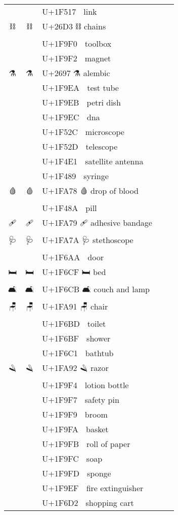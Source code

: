 \documentclass[a4paper,12pt]{ltjarticle}
\newcommand{\fontA}[1]{{\fontspec[RawFeature={mode=harf,+dist,+ccmp}]{Segoe UI Emoji} #1}}
\newcommand{\fontB}[1]{{\fontspec[RawFeature={mode=harf,+dist,+ccmp}]{Noto Color Emoji} #1}}
\begin{document}
\begin{longtable}[c]{ccp{0.8\linewidth}}
\fontA{🔗}&\fontB{🔗}&U+1F517 🔗 link\\
\fontA{⛓}&\fontB{⛓}&U+26D3 ⛓ chains\\
\fontA{🧰}&\fontB{🧰}&U+1F9F0 🧰 toolbox\\
\fontA{🧲}&\fontB{🧲}&U+1F9F2 🧲 magnet\\
\fontA{⚗}&\fontB{⚗}&U+2697 ⚗ alembic\\
\fontA{🧪}&\fontB{🧪}&U+1F9EA 🧪 test tube\\
\fontA{🧫}&\fontB{🧫}&U+1F9EB 🧫 petri dish\\
\fontA{🧬}&\fontB{🧬}&U+1F9EC 🧬 dna\\
\fontA{🔬}&\fontB{🔬}&U+1F52C 🔬 microscope\\
\fontA{🔭}&\fontB{🔭}&U+1F52D 🔭 telescope\\
\fontA{📡}&\fontB{📡}&U+1F4E1 📡 satellite antenna\\
\fontA{💉}&\fontB{💉}&U+1F489 💉 syringe\\
\fontA{🩸}&\fontB{🩸}&U+1FA78 🩸 drop of blood\\
\fontA{💊}&\fontB{💊}&U+1F48A 💊 pill\\
\fontA{🩹}&\fontB{🩹}&U+1FA79 🩹 adhesive bandage\\
\fontA{🩺}&\fontB{🩺}&U+1FA7A 🩺 stethoscope\\
\fontA{🚪}&\fontB{🚪}&U+1F6AA 🚪 door\\
\fontA{🛏}&\fontB{🛏}&U+1F6CF 🛏 bed\\
\fontA{🛋}&\fontB{🛋}&U+1F6CB 🛋 couch and lamp\\
\fontA{🪑}&\fontB{🪑}&U+1FA91 🪑 chair\\
\fontA{🚽}&\fontB{🚽}&U+1F6BD 🚽 toilet\\
\fontA{🚿}&\fontB{🚿}&U+1F6BF 🚿 shower\\
\fontA{🛁}&\fontB{🛁}&U+1F6C1 🛁 bathtub\\
\fontA{🪒}&\fontB{🪒}&U+1FA92 🪒 razor\\
\fontA{🧴}&\fontB{🧴}&U+1F9F4 🧴 lotion bottle\\
\fontA{🧷}&\fontB{🧷}&U+1F9F7 🧷 safety pin\\
\fontA{🧹}&\fontB{🧹}&U+1F9F9 🧹 broom\\
\fontA{🧺}&\fontB{🧺}&U+1F9FA 🧺 basket\\
\fontA{🧻}&\fontB{🧻}&U+1F9FB 🧻 roll of paper\\
\fontA{🧼}&\fontB{🧼}&U+1F9FC 🧼 soap\\
\fontA{🧽}&\fontB{🧽}&U+1F9FD 🧽 sponge\\
\fontA{🧯}&\fontB{🧯}&U+1F9EF 🧯 fire extinguisher\\
\fontA{🛒}&\fontB{🛒}&U+1F6D2 🛒 shopping cart\\

\end{longtable}
\end{document}

